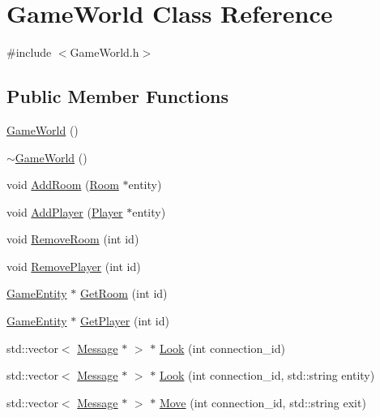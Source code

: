 \hypertarget{class_game_world}{}\section{Game\+World Class Reference}
\label{class_game_world}


{\ttfamily \#include $<$Game\+World.\+h$>$}

\subsection*{Public Member Functions}
\begin{DoxyCompactItemize}
\item 
\hyperlink{class_game_world_a681994123c12833d43c957d6cfb33765}{Game\+World} ()
\item 
\hyperlink{class_game_world_a522631cd4ab9534c5b09af09d8a82c9b}{$\sim$\+Game\+World} ()
\item 
void \hyperlink{class_game_world_abb3bfb7dea57b36a579c9ad49eca4bd1}{Add\+Room} (\hyperlink{class_room}{Room} $\ast$entity)
\item 
void \hyperlink{class_game_world_a79dd5e422a5cfab06c1a722ac3cbbd07}{Add\+Player} (\hyperlink{class_player}{Player} $\ast$entity)
\item 
void \hyperlink{class_game_world_a0870be49ea4ccd0bba56bcbb8820b289}{Remove\+Room} (int id)
\item 
void \hyperlink{class_game_world_a40afc5ab96bde45ecaa4ca795978c9c8}{Remove\+Player} (int id)
\item 
\hyperlink{class_game_entity}{Game\+Entity} $\ast$ \hyperlink{class_game_world_ad603f152db9f0de19418f1183ff02e25}{Get\+Room} (int id)
\item 
\hyperlink{class_game_entity}{Game\+Entity} $\ast$ \hyperlink{class_game_world_a0f59d9498e26ece0122c73e0dc563d91}{Get\+Player} (int id)
\item 
std\+::vector$<$ \hyperlink{class_message}{Message} $\ast$ $>$ $\ast$ \hyperlink{class_game_world_ad6920d1ef791b83a80f4cfcfad9d6ffe}{Look} (int connection\+\_\+id)
\item 
std\+::vector$<$ \hyperlink{class_message}{Message} $\ast$ $>$ $\ast$ \hyperlink{class_game_world_aa3f98d0f2cc76db913129ea2d4442e3b}{Look} (int connection\+\_\+id, std\+::string entity)
\item 
std\+::vector$<$ \hyperlink{class_message}{Message} $\ast$ $>$ $\ast$ \hyperlink{class_game_world_a6c0faa19f014214487640a2cba5a42b3}{Move} (int connection\+\_\+id, std\+::string exit)

\end{DoxyCompactItemize}
